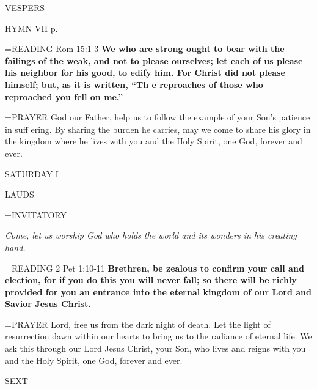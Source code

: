 \begin{flushleft}\normalsize VESPERS\\\end{flushleft}

HYMN VII p. \pageref{ordinaryTime:lastHymn}

\hangindent=\parindent \small{READING} Rom 15:1-3 \textbf{We who are strong ought to bear with the failings of the weak, and not to please ourselves; let each of us please his neighbor for his good, to edify him. For Christ did not please himself; but, as it is written, “Th e reproaches of those who reproached you fell on me.”\\}

\hangindent=\parindent \small{PRAYER  God our Father, help us to follow the example of your Son’s patience in suff ering. By sharing the burden he carries, may we come to share his glory in the kingdom where he lives with you and the Holy Spirit, one God, forever and ever.}

\begin{center}
\normalsize SATURDAY I
\end{center}

\begin{flushleft}\normalsize LAUDS\\\end{flushleft}

\hangindent=\parindent \small{INVITATORY}
\begin{center}
\textit{Come, let us worship God who holds the world and its wonders in his creating hand.\\}
\end{center}

\hangindent=\parindent \small{READING} 2 Pet 1:10-11 \textbf{Brethren, be zealous to confirm your call and election, for if you do this you will never fall; so there will be richly provided for you an entrance into the eternal kingdom of our Lord and Savior Jesus Christ.\\}

\hangindent=\parindent \small{PRAYER  Lord, free us from the dark night of death. Let the light of resurrection dawn within our hearts to bring us to the radiance of eternal life. We ask this through our Lord Jesus Christ, your Son, who lives and reigns with you and the Holy Spirit, one God, forever and ever.}

\begin{flushleft}\normalsize SEXT\\\end{flushleft}

